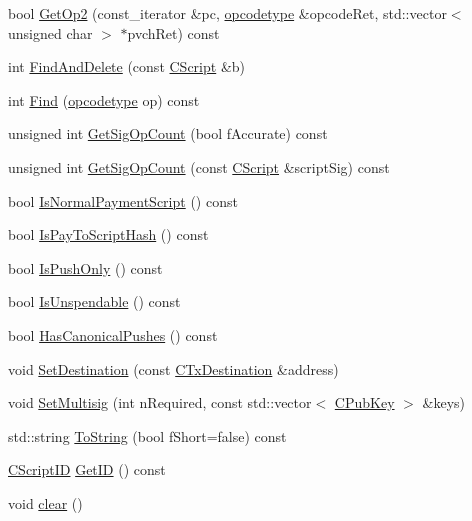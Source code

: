 \begin{DoxyCompactItemize}
\item 
bool \hyperlink{class_c_script_a93ec95275ccce9b701c8f53c57cd7975}{Get\+Op2} (const\+\_\+iterator \&pc, \hyperlink{script_8h_a63e349a6089a54da9fe09a3d858648bd}{opcodetype} \&opcode\+Ret, std\+::vector$<$ unsigned char $>$ $\ast$pvch\+Ret) const 
\item 
int \hyperlink{class_c_script_aad6e9f84fe8aa2d27a979f1bc2732463}{Find\+And\+Delete} (const \hyperlink{class_c_script}{C\+Script} \&b)
\item 
int \hyperlink{class_c_script_af38dbc6bf2023f49eca4a4106f88fb32}{Find} (\hyperlink{script_8h_a63e349a6089a54da9fe09a3d858648bd}{opcodetype} op) const 
\item 
unsigned int \hyperlink{class_c_script_ad4a8173c235111e93a8171b1f8d00ce8}{Get\+Sig\+Op\+Count} (bool f\+Accurate) const 
\item 
unsigned int \hyperlink{class_c_script_a81b6b6515acc42ce4fdf889ed94b9a00}{Get\+Sig\+Op\+Count} (const \hyperlink{class_c_script}{C\+Script} \&script\+Sig) const 
\item 
bool \hyperlink{class_c_script_a2b3ee98f7a63916b67b91dfd2c4ee312}{Is\+Normal\+Payment\+Script} () const 
\item 
bool \hyperlink{class_c_script_acba6d6d35776de4ce3a632446f44805f}{Is\+Pay\+To\+Script\+Hash} () const 
\item 
bool \hyperlink{class_c_script_a0a29e513d962967c4351828780ab4d9f}{Is\+Push\+Only} () const 
\item 
bool \hyperlink{class_c_script_a5d8efd005dde9242d88212c8b7fdb696}{Is\+Unspendable} () const 
\item 
bool \hyperlink{class_c_script_afb9f817abc9674ab0278b0eb32d10c39}{Has\+Canonical\+Pushes} () const 
\item 
void \hyperlink{class_c_script_ad1b5a9077241aa06116040c4f1b7c31e}{Set\+Destination} (const \hyperlink{keystore_8h_a8f46ecba0ddeb036be6b58d6ed1909cd}{C\+Tx\+Destination} \&address)
\item 
void \hyperlink{class_c_script_a1bb2091fd110a07fabed259b94589227}{Set\+Multisig} (int n\+Required, const std\+::vector$<$ \hyperlink{class_c_pub_key}{C\+Pub\+Key} $>$ \&keys)
\item 
std\+::string \hyperlink{class_c_script_a391abaa856cf8511bc840fef949839d9}{To\+String} (bool f\+Short=false) const 
\item 
\hyperlink{class_c_script_i_d}{C\+Script\+I\+D} \hyperlink{class_c_script_a59fd961e1b74202a0951a077b576c0ba}{Get\+I\+D} () const 
\item 
void \hyperlink{class_c_script_a7b2baf842621f07c4939408acf63377c}{clear} ()
\end{DoxyCompactItemize}
